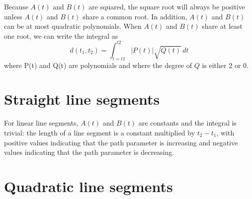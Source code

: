 \documentclass[12pt]{article}
\begin{document}
Because $A(t)$ and $B(t)$ are squared, the square root will
always be positive unless $A(t)$ and $B(t)$ share a common
root.  In addition, $A(t)$ and $B(t)$ can be at most quadratic
polynomials. When $A(t)$ and $B(t)$ share at least one root,
we can write the integral as
\[ d(t_1,t_2) = \int_{t=t1}^{t2}|P(t)|\sqrt{Q(t)}\,dt\]
where P(t) and Q(t) are polynomials and where the degree of
$Q$ is either 2 or 0.
      
\section{Straight line segments} \label{linear}

For linear line segments, $A(t)$ and $B(t)$ are constants and the
integral is trivial: the length of a line segment is a constant
multiplied by $t_2 - t_1$, with positive values indicating that the
path parameter is increasing and negative values indicating that the
path parameter is decreasing.

\section{Quadratic line segments} \label{quadratic}
\end{document}

